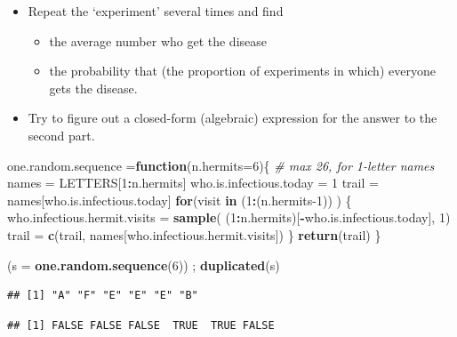 \documentclass[]{book}
\newenvironment{Shaded}{\begin{snugshade}}{\end{snugshade}}
\newcommand{\CommentTok}[1]{\textcolor[rgb]{0.56,0.35,0.01}{\textit{#1}}}
\newcommand{\ControlFlowTok}[1]{\textcolor[rgb]{0.13,0.29,0.53}{\textbf{#1}}}
\newcommand{\DataTypeTok}[1]{\textcolor[rgb]{0.13,0.29,0.53}{#1}}
\newcommand{\DecValTok}[1]{\textcolor[rgb]{0.00,0.00,0.81}{#1}}
\newcommand{\KeywordTok}[1]{\textcolor[rgb]{0.13,0.29,0.53}{\textbf{#1}}}
\newcommand{\NormalTok}[1]{#1}
\newcommand{\OperatorTok}[1]{\textcolor[rgb]{0.81,0.36,0.00}{\textbf{#1}}}
\newcommand{\StringTok}[1]{\textcolor[rgb]{0.31,0.60,0.02}{#1}}
\providecommand{\tightlist}{%
  \setlength{\itemsep}{0pt}\setlength{\parskip}{0pt}}
\begin{document}
\begin{itemize}
\tightlist
\item
  Repeat the `experiment' several times and find

  \begin{itemize}
  \tightlist
  \item
    the average number who get the disease
  \item
    the probability that (the proportion of experiments in which) everyone gets the disease.
  \end{itemize}
\item
  Try to figure out a closed-form (algebraic) expression for the answer to the second part.
\end{itemize}

\begin{Shaded}
\begin{Highlighting}[]
\NormalTok{one.random.sequence =}\ControlFlowTok{function}\NormalTok{(}\DataTypeTok{n.hermits=}\DecValTok{6}\NormalTok{)\{ }\CommentTok{# max 26, for 1-letter names}
\NormalTok{    names =}\StringTok{ }\NormalTok{LETTERS[}\DecValTok{1}\OperatorTok{:}\NormalTok{n.hermits]}
\NormalTok{    who.is.infectious.today =}\StringTok{ }\DecValTok{1}
\NormalTok{    trail =}\StringTok{ }\NormalTok{names[who.is.infectious.today]}
    \ControlFlowTok{for}\NormalTok{(visit }\ControlFlowTok{in}\NormalTok{ (}\DecValTok{1}\OperatorTok{:}\NormalTok{(n.hermits}\DecValTok{-1}\NormalTok{)) ) \{}
\NormalTok{        who.infectious.hermit.visits =}\StringTok{ }
\StringTok{         }\KeywordTok{sample}\NormalTok{( (}\DecValTok{1}\OperatorTok{:}\NormalTok{n.hermits)[}\OperatorTok{-}\NormalTok{who.is.infectious.today], }\DecValTok{1}\NormalTok{)}
\NormalTok{       trail =}\StringTok{ }\KeywordTok{c}\NormalTok{(trail, names[who.infectious.hermit.visits])}
\NormalTok{    \}}
    \KeywordTok{return}\NormalTok{(trail)}
\NormalTok{\}}

\NormalTok{(}\DataTypeTok{s =} \KeywordTok{one.random.sequence}\NormalTok{(}\DecValTok{6}\NormalTok{)) ; }\KeywordTok{duplicated}\NormalTok{(s)}
\end{Highlighting}
\end{Shaded}

\begin{verbatim}
## [1] "A" "F" "E" "E" "E" "B"
\end{verbatim}

\begin{verbatim}
## [1] FALSE FALSE FALSE  TRUE  TRUE FALSE
\end{verbatim}
\end{document}
